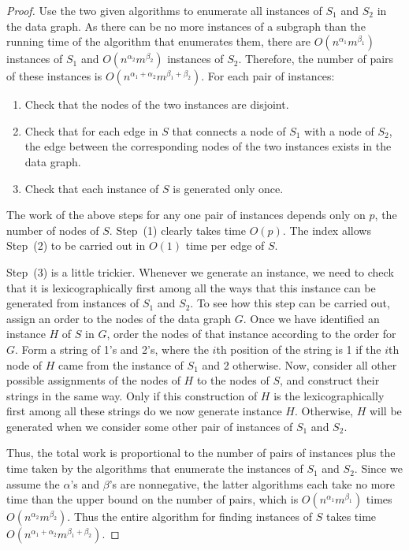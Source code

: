 \begin{proof}
Use the two given algorithms to enumerate all instances of $S_1$ and $S_2$ in the data graph.
As there can be no more in\-stan\-ces of a subgraph than the running time of the algorithm that enum\-er\-ates them, there are $O(n^{\alpha_1}m^{\beta_1})$ instances of $S_1$ and  $O(n^{\alpha_2}m^{\beta_2})$ instances of $S_2$. Therefore, the number of pairs of these instances is  $O(n^{\alpha_1+\alpha_2}m^{\beta_1+\beta_2})$.  For each pair of instances:

\begin{enumerate}

\item
Check that the nodes of the two instances are disjoint.

\item
Check that for each edge in $S$ that connects a node of $S_1$ with a node of $S_2$, the edge between the corresponding nodes of the two instances exists in the data graph.

\item
Check that each instance of $S$ is generated only once.

\end{enumerate}

The work of the above steps for any one pair of instances depends only on $p$, the number of nodes of $S$.  Step~(1) clearly takes time $O(p)$.  The index allows Step~(2) to be carried out in $O(1)$ time per edge of $S$.

Step~(3) is a little trickier.  Whenever we generate an instance, we need to check that it is lexicographically first among all the ways that this instance can be generated from instances of $S_1$ and $S_2$.  To see how this step can be carried out, assign an order to the nodes of the data graph $G$.  Once we have identified an instance $H$ of $S$ in $G$, order the nodes of that instance according to the order for $G$.  Form a string of 1's and 2's, where the $i$th position of the string is 1 if the $i$th node of $H$ came from the instance of $S_1$ and 2 otherwise.  Now, consider all other possible assignments of the nodes of $H$ to the nodes of $S$, and construct their strings in the same way.  Only if this construction of $H$ is the lexicographically first among all these strings do we now generate instance $H$.  Otherwise, $H$ will be generated when we consider some other pair of instances of $S_1$ and $S_2$.

Thus, the total work is proportional to the number of pairs of instances plus the time taken by the algorithms that enumerate the instances of $S_1$ and $S_2$.  Since we assume the $\alpha$'s and $\beta$'s are nonnegative, the latter algorithms each take no more time than the upper bound on the number of pairs, which is $O(n^{\alpha_1}m^{\beta_1})$ times $O(n^{\alpha_2}m^{\beta_2})$.  Thus the entire algorithm for finding instances of $S$ takes time $O(n^{\alpha_1+\alpha_2}m^{\beta_1+\beta_2})$.
\end{proof}

